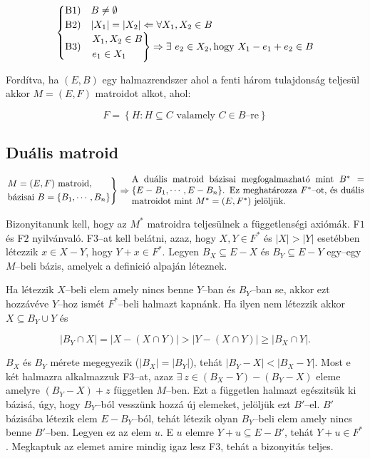\[
\begin{cases}
\mbox{B1)} & B \neq \emptyset \\
\mbox{B2)} & |X_1|=|X_2| \Leftarrow \forall X_1,X_2 \in B\\
\mbox{B3)} & \begin{rcases}
X_1, X_2 \in B \\
e_1 \in X_1
\end{rcases}\Rightarrow \exists~e_2 \in X_2, \mbox{hogy } X_1-e_1+e_2 \in B \\
\end{cases}
\]

Fordítva, ha $(E,B)$ egy halmazrendszer ahol a fenti három tulajdonság teljesül akkor $M=(E,F)$
matroidot alkot, ahol:

\[
F = \left\{H: H \subseteq C \mbox{ valamely } C \in B\mbox{--re}\right\}
\]

\subsection{Duális matroid}

\[
\begin{rcases}
M=(E,F) \mbox{ matroid}, \\
\mbox{bázisai } B=\{B_1, \cdots, B_n\}
\end{rcases} \Rightarrow
\parbox[L]{9cm} {
A duális matroid bázisai megfogalmazható mint $B^*=\{E-B_1, \cdots, E-B_n\}$.
Ez meghatározza $F^*$--ot, és duális matroidot mint $M^*=(E,F^*)$ jelöljük.}
\]

Bizonyitanunk kell, hogy az $M^*$ matroidra teljesülnek a függetlenségi axiómák.
F$1$ és F$2$ nyilvánvaló. F$3$--at kell belátni, azaz, hogy $X,Y \in F^*$ és
$|X|>|Y|$ esetébben létezzik $x \in X-Y$, hogy $Y+x \in F^*$. Legyen $B_X
\subseteq E-X$ és $B_Y\subseteq E-Y$ egy--egy $M$--beli bázis, amelyek a
definició alpaján léteznek.

Ha létezzik $X$--beli elem amely nincs benne $Y$--ban és $B_Y$--ban se, akkor
ezt hozzávéve $Y$--hoz ismét $F^*$--beli halmazt kapnánk. Ha ilyen nem létezzik akkor 
$X \subseteq B_Y \cup Y$ és

\[
|B_Y \cap X | = |X-(X \cap Y)| > |Y - (X \cap Y)| \geq |B_X \cap Y|.
\]

$B_X$ és $B_Y$ mérete megegyezik ($|B_X|=|B_Y|$), tehát $|B_Y-X| < |B_X-Y|$.
Most e két halmazra alkalmazzuk F$3$--at, azaz $\exists~z \in (B_X-Y)-(B_Y-X)$
eleme amelyre $(B_Y-X)+z$ független $M$--ben. Ezt a független halmazt egészitsük
ki bázisá, úgy, hogy $B_Y$--ból vesszünk hozzá új elemeket, jelöljük ezt
$B'$--el. $B'$ bázisába létezik elem $E-B_Y$--ból, tehát létezik olyan $B_Y$--beli elem 
amely nincs benne $B'$--ben. Legyen ez az elem $u$. E $u$ elemre $Y+u \subseteq E - B'$,
tehát $Y+u \in F^*$. Megkaptuk az elemet amire mindig igaz lesz F$3$, tehát a bizonyitás
teljes. 

